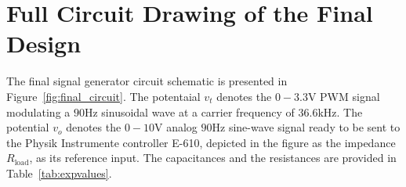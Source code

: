 %

%

\section{Full Circuit Drawing of the Final Design}
\label{sec:fulldesign}

The final signal generator circuit schematic is presented in
Figure~\ref{fig:final_circuit}. The potentaial $v_t$ denotes the
$0-3.3$\unit{\volt} PWM signal modulating a $90$\unit{\hertz} sinusoidal wave at
a carrier frequency of $36.6$\unit{\kilo\hertz}. The potential $v_o$ denotes the
$0-10$\unit{\volt} analog $90$\unit{\hertz} sine-wave signal ready to be sent to
the Physik Instrumente controller E-610, depicted in the figure as the impedance
$R_{\text{load}}$, as its reference input. The capacitances and the resistances
are provided in Table~\ref{tab:expvalues}.

